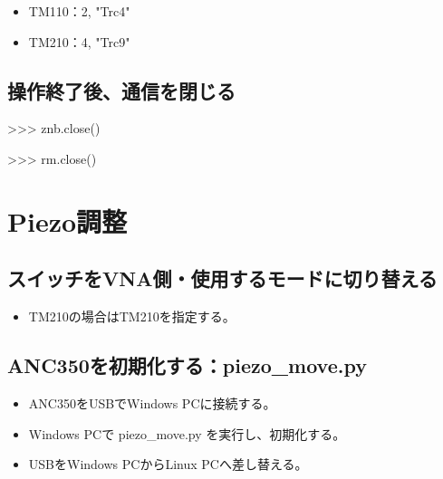 \documentclass[a4paper,11pt]{ltjsarticle}
\begin{document}
\begin{itemize}

\item TM110：2, "Trc4"

\item TM210：4, "Trc9"

\end{itemize}

\subsection{操作終了後、通信を閉じる}

\begin{command}

>>> znb.close()

>>> rm.close()

\end{command}

\section{Piezo調整}

\subsection{スイッチをVNA側・使用するモードに切り替える}

\begin{command}


\end{command}

\begin{itemize}

\item TM210の場合はTM210を指定する。

\end{itemize}

\subsection{ANC350を初期化する：piezo\_move.py}

\begin{itemize}

\item ANC350をUSBでWindows PCに接続する。

\item Windows PCで piezo\_move.py を実行し、初期化する。

\item USBをWindows PCからLinux PCへ差し替える。

\end{itemize}
\end{document}
